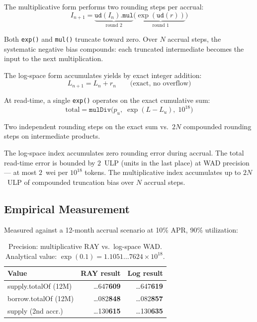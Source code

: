 \documentclass[10pt,a4paper,twocolumn]{article}
\begin{document}
The multiplicative form performs two rounding steps per accrual:
\begin{equation}
I_{n+1} = \underbrace{\texttt{ud}(I_n).\texttt{mul}}_{\text{round 2}}\bigl(\underbrace{\exp(\texttt{ud}(r))}_{\text{round 1}}\bigr)
\end{equation}

Both \texttt{exp()} and \texttt{mul()} truncate toward zero. Over $N$ accrual steps, the systematic negative bias compounds: each truncated intermediate becomes the input to the next multiplication.

The log-space form accumulates yields by exact integer addition:
\begin{equation}
L_{n+1} = L_n + r_n \qquad \text{(exact, no overflow)}
\end{equation}

At read-time, a single \texttt{exp()} operates on the exact cumulative sum:
\begin{equation}
\text{total} = \texttt{mulDiv}\bigl(p_u,\; \exp(L - L_u),\; 10^{18}\bigr)
\end{equation}

Two independent rounding steps on the exact sum vs.\ $2N$ compounded rounding steps on intermediate products.

\begin{theorem}
\label{thm:precision}
The log-space index accumulates zero rounding error during accrual. The total read-time error is bounded by $2$~ULP (units in the last place) at WAD precision --- at most $2$~wei per $10^{18}$ tokens. The multiplicative index accumulates up to $2N$~ULP of compounded truncation bias over $N$ accrual steps.
\end{theorem}

\subsection{Empirical Measurement}
\label{subsec:precision-empirical}

Measured against a 12-month accrual scenario at 10\% APR, 90\% utilization:

\begin{table}[htbp]
\centering
\caption{Precision: multiplicative RAY vs.\ log-space WAD. Analytical value: $\exp(0.1) = 1.1051{\ldots}7624 \times 10^{18}$.}
\label{tab:precision}
\small
\begin{tabular*}{0.95\columnwidth}{@{\extracolsep{\fill}}lrr@{}}
\toprule
Value & RAY result & Log result \\
\midrule
supply.totalOf (12M) & \ldots647\textbf{609} & \ldots647\textbf{619} \\
borrow.totalOf (12M) & \ldots082\textbf{848} & \ldots082\textbf{857} \\
supply (2nd accr.) & \ldots130\textbf{615} & \ldots130\textbf{635} \\
\bottomrule
\end{tabular*}
\end{table}
\end{document}
